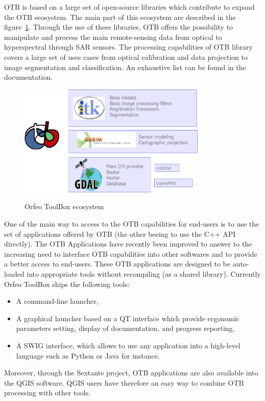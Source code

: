 \documentclass{josis}
\begin{document}
OTB is based on a large set of open-source libraries which contribute
to expand the OTB ecosystem. The main part of this ecosystem are
described in the figure~\ref{fig:ecosystem}. Through the use of these
libraries, OTB offers the possibility to manipulate and process the
main remote-sensing data from optical to hyperspectral through SAR
sensors. The processing capabilities of OTB library covers a large set
of uses cases from optical calibration and data projection to image
segmentation and classification. An exhaustive list can be found in
the documentation.

\begin{figure}[!htb]
\centering
\includegraphics[width=0.8\textwidth]{Pictures/otb_ecosystem}\label{fig:ecosystem}
\caption{Orfeo ToolBox ecosystem}
\end{figure}

One of the main way to access to the OTB capabilities for end-users is
to use the set of applications offered by OTB (the other beeing to use
the C++ API directly). The OTB Applications have recently been
improved to answer to the increasing need to interface OTB
capabilities into other softwares and to provide a better access to
end-users. These OTB applications are designed to be auto-loaded into
appropriate tools without recompiling (as a shared library). Currently
Orfeo ToolBox ships the following tools:
\begin{itemize}
\item A command-line launcher,
\item A graphical launcher based on a QT interface which provide
  ergonomic parameters setting, display of documentation, and progress
  reporting,
\item A SWIG interface, which allows to use any application into a
  high-level language such as Python or Java for instance.
\end{itemize}
Moreover, through the Sextante project, OTB applications are also
available into the QGIS software. QGIS users have therefore an easy
way to combine OTB processing with other tools.
\end{document}
